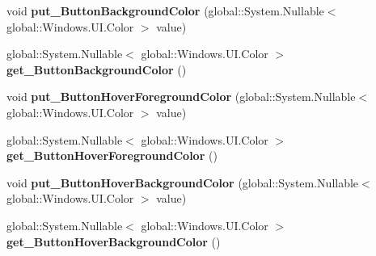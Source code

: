 \begin{DoxyCompactItemize}
\item 
\mbox{\label{interface_windows_1_1_u_i_1_1_view_management_1_1_i_application_view_title_bar_aa30ceb6cb754d6fe22cc1f9349cec11c}} 
void {\bfseries put\+\_\+\+Button\+Background\+Color} (global\+::\+System.\+Nullable$<$ global\+::\+Windows.\+U\+I.\+Color $>$ value)
\item 
\mbox{\label{interface_windows_1_1_u_i_1_1_view_management_1_1_i_application_view_title_bar_a4c1cd45075a51fbe4b7c200617ff974c}} 
global\+::\+System.\+Nullable$<$ global\+::\+Windows.\+U\+I.\+Color $>$ {\bfseries get\+\_\+\+Button\+Background\+Color} ()
\item 
\mbox{\label{interface_windows_1_1_u_i_1_1_view_management_1_1_i_application_view_title_bar_a70edac05b4d8c02ec835656bd77600ee}} 
void {\bfseries put\+\_\+\+Button\+Hover\+Foreground\+Color} (global\+::\+System.\+Nullable$<$ global\+::\+Windows.\+U\+I.\+Color $>$ value)
\item 
\mbox{\label{interface_windows_1_1_u_i_1_1_view_management_1_1_i_application_view_title_bar_a8e5e568a776ecf6968851eb773d8b3a0}} 
global\+::\+System.\+Nullable$<$ global\+::\+Windows.\+U\+I.\+Color $>$ {\bfseries get\+\_\+\+Button\+Hover\+Foreground\+Color} ()
\item 
\mbox{\label{interface_windows_1_1_u_i_1_1_view_management_1_1_i_application_view_title_bar_ac3bb322995b31276ea3d74f26c96bf61}} 
void {\bfseries put\+\_\+\+Button\+Hover\+Background\+Color} (global\+::\+System.\+Nullable$<$ global\+::\+Windows.\+U\+I.\+Color $>$ value)
\item 
\mbox{\label{interface_windows_1_1_u_i_1_1_view_management_1_1_i_application_view_title_bar_aedbbe25029f1110ca3e011445e1c6f20}} 
global\+::\+System.\+Nullable$<$ global\+::\+Windows.\+U\+I.\+Color $>$ {\bfseries get\+\_\+\+Button\+Hover\+Background\+Color} ()

\end{DoxyCompactItemize}
